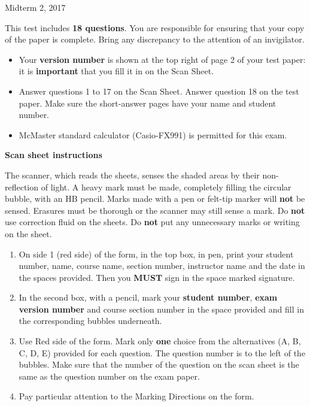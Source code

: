 \documentclass[12pt]{article}
\begin{document}
{ \par}
{\centering Midterm 2, 2017 \par}

\parindent0pt

\vfill

This test includes {\bf 18 questions}. You are responsible for ensuring that your copy of the paper is complete. Bring any discrepancy to the attention of an invigilator. 

\vfill

\begin{itemize}
\item Your \textbf{version number} is shown at the top right of page 2 of your test paper: it is \textbf{important} that you fill it in on the Scan Sheet.
\item Answer questions 1 to 17 on the Scan Sheet. Answer question 18 on the test paper. Make sure the short-answer pages have your name and student number.
\item McMaster standard calculator (Casio-FX991) is permitted for this exam.
\end{itemize}

\vfill

\textbf{Scan sheet instructions}

\small{
The scanner, which reads the sheets, senses the shaded areas by their non-reflection of light. A heavy mark must be made, completely filling the circular bubble, with an HB pencil. Marks made with a pen or felt-tip marker will \textbf{not} be sensed. Erasures must be thorough or the scanner may still sense a mark. Do \textbf{not} use correction fluid on the sheets. Do \textbf{not} put any unnecessary marks or writing on the sheet.

\begin{enumerate}
\item On side 1 (red side) of the form, in the top box, in pen, print your student number, name, course name, section number, instructor name and the date in the spaces provided. Then you {\bf MUST} sign in the space marked signature.

\item In the second box, with a pencil, mark your {\bf student number}, {\bf exam version number} and course section number in the space provided and fill in the corresponding bubbles underneath.

\item Use Red side of the form. Mark only {\bf one} choice from the alternatives (A, B, C, D, E) provided for each question. The question number is to the left of the bubbles. Make sure that the number of the question on the scan sheet is the same as the question number on the exam paper.
\item  Pay particular attention to the Marking Directions on the form.
\end{enumerate}
}

\vfill
{ \par}
\end{document}

